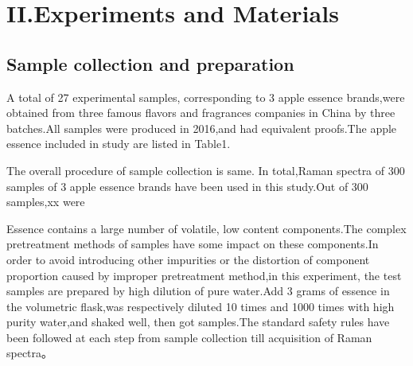 \documentclass[a4paper]{article}
\begin{document}
\section{II.Experiments and Materials}
\subsection{Sample collection and preparation}
A total of 27 experimental samples, corresponding to 3 apple essence brands,were obtained from three famous flavors and fragrances companies in China by three batches.All samples were produced in 2016,and had equivalent proofs.The apple essence included in study are listed in Table1.

The overall procedure of sample collection is same. In total,Raman spectra of 300 samples of 3 apple essence brands have been used in this study.Out of 300 samples,xx were

Essence contains a large number of volatile, low content components.The complex pretreatment methods of samples have some impact on these components.In order to avoid introducing other impurities or the distortion of component proportion caused by improper pretreatment method,in this experiment, the test samples are prepared by high dilution of pure water.Add 3 grams of essence in the volumetric flask,was respectively diluted 10 times and 1000 times with high purity water,and  shaked well, then got samples.The  standard  safety  rules  have  been  followed  at  each step from sample collection till acquisition of Raman spectra。

\end{document}
